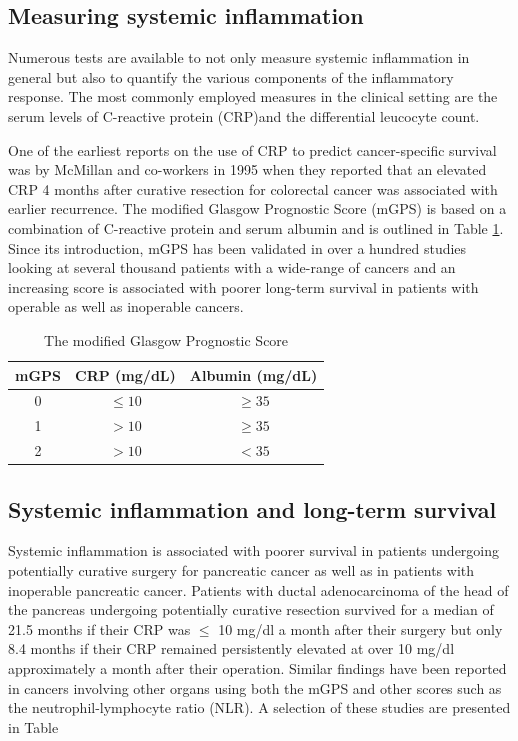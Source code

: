 \subsection{Measuring systemic inflammation}
Numerous tests are available to not only measure systemic inflammation in general but also to quantify the various components of the inflammatory response. The most commonly employed measures in the clinical setting are the serum levels of C-reactive protein (CRP)and the differential leucocyte count. 

One of the earliest reports on the use of CRP to predict cancer-specific survival was by McMillan and co-workers in 1995 when they reported that an elevated CRP 4 months after curative resection for colorectal cancer was associated with earlier recurrence.\parencite{mcmillan_prospective_1995} The modified Glasgow Prognostic Score (mGPS)\parencite{elahi_score_2004} is based on a combination of C-reactive protein and serum albumin and is outlined in Table \ref{table:mGPS}. Since its introduction, mGPS has been validated in over a hundred studies looking at several thousand patients with a wide-range of cancers and an increasing score is associated with poorer long-term survival in patients with operable as well as inoperable cancers.

\begin{table}[h]
	\centering
	\caption{The modified Glasgow Prognostic Score}
	\label{table:mGPS}
	\begin{tabular}{c c c}
		mGPS & CRP (mg/dL) & Albumin  (mg/dL) \\ \hline
		 0   & $\leq 10$   & $\geq 35$        \\
		 1   & $> 10$      & $\geq 35$        \\
		 2   & $> 10$      & $< 35$
	\end{tabular}
\end{table}

\subsection{Systemic inflammation and long-term survival}
Systemic inflammation is associated with poorer survival in patients undergoing potentially curative surgery for pancreatic cancer \parencite{jamieson_systemic_2005,clark_preoperative_2007,bhatti_preoperative_2010} as well as in patients with inoperable pancreatic cancer.\parencite{glen_evaluation_2006} Patients with ductal adenocarcinoma of the head of the pancreas undergoing potentially curative resection survived for a median of 21.5 months if their CRP was $\leq$ 10 mg/dl a month after their surgery but only 8.4 months if their CRP remained persistently elevated at over 10 mg/dl approximately a month after their operation.\parencite{jamieson_systemic_2005} Similar findings have been reported in cancers involving other organs using both the mGPS and other scores such as the neutrophil-lymphocyte ratio (NLR). A selection of these studies are presented in Table %

